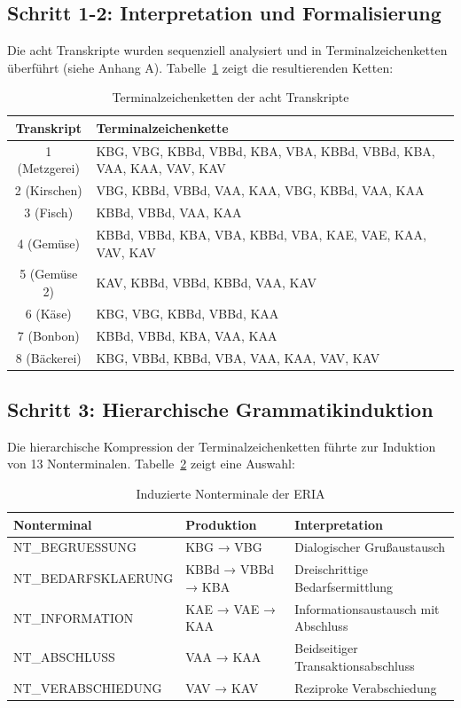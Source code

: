 \documentclass[12pt,a4paper]{article}
\begin{document}
\subsection{Schritt 1-2: Interpretation und Formalisierung}

Die acht Transkripte wurden sequenziell analysiert und in Terminalzeichenketten 
überführt (siehe Anhang A). Tabelle~\ref{tab:chains} zeigt die resultierenden 
Ketten:

\begin{table}[H]
\centering
\caption{Terminalzeichenketten der acht Transkripte}
\label{tab:chains}
\begin{tabular}{@{} c l @{}}
\toprule
\textbf{Transkript} & \textbf{Terminalzeichenkette} \\
\midrule
1 (Metzgerei) & KBG, VBG, KBBd, VBBd, KBA, VBA, KBBd, VBBd, KBA, VAA, KAA, VAV, KAV \\
2 (Kirschen) & VBG, KBBd, VBBd, VAA, KAA, VBG, KBBd, VAA, KAA \\
3 (Fisch) & KBBd, VBBd, VAA, KAA \\
4 (Gemüse) & KBBd, VBBd, KBA, VBA, KBBd, VBA, KAE, VAE, KAA, VAV, KAV \\
5 (Gemüse 2) & KAV, KBBd, VBBd, KBBd, VAA, KAV \\
6 (Käse) & KBG, VBG, KBBd, VBBd, KAA \\
7 (Bonbon) & KBBd, VBBd, KBA, VAA, KAA \\
8 (Bäckerei) & KBG, VBBd, KBBd, VBA, VAA, KAA, VAV, KAV \\
\bottomrule
\end{tabular}
\end{table}

\subsection{Schritt 3: Hierarchische Grammatikinduktion}

Die hierarchische Kompression der Terminalzeichenketten führte zur Induktion 
von 13 Nonterminalen. Tabelle~\ref{tab:nonterm} zeigt eine Auswahl:

\begin{table}[H]
\centering
\caption{Induzierte Nonterminale der ERIA}
\label{tab:nonterm}
\begin{tabular}{@{} l l l @{}}
\toprule
\textbf{Nonterminal} & \textbf{Produktion} & \textbf{Interpretation} \\
\midrule
NT\_BEGRUESSUNG & KBG → VBG & Dialogischer Grußaustausch \\
NT\_BEDARFSKLAERUNG & KBBd → VBBd → KBA & Dreischrittige Bedarfsermittlung \\
NT\_INFORMATION & KAE → VAE → KAA & Informationsaustausch mit Abschluss \\
NT\_ABSCHLUSS & VAA → KAA & Beidseitiger Transaktionsabschluss \\
NT\_VERABSCHIEDUNG & VAV → KAV & Reziproke Verabschiedung \\
\bottomrule
\end{tabular}
\end{table}
\end{document}
